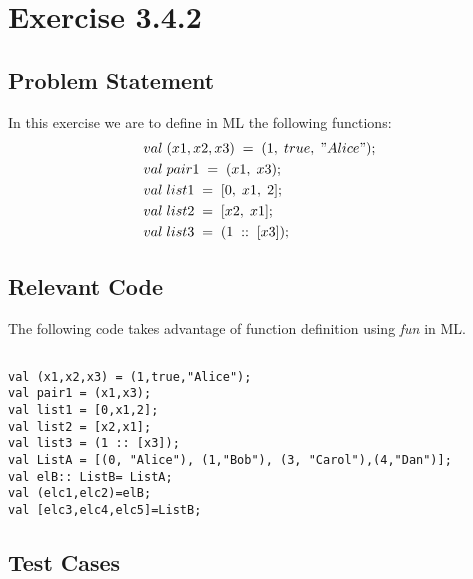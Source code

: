 \documentclass{report}
\begin{document}
\chapter{Exercise 3.4.2}
\label{cha:exercise-3.4.2}


\section{Problem Statement}
\label{sec:problem-statement-7}
In this exercise we are to define in ML the following functions:
\begin{align*}
&val\; (x1,x2,x3)\; = \;(1,\;true,\;"Alice");\\
&val\; pair1\; =\; (x1,\;x3);\\
&val\; list1\; =\; [0,\;x1,\;2];\\
&val\; list2\; =\; [x2,\;x1];\\
&val\; list3\; =\; (1\; ::\; [x3]);\\
\end{align*}


\section{Relevant Code}
\label{sec:relevant-code-3}
The following code takes advantage of function definition using
\emph{fun} in ML.

\lstset{frameround=fftt}
\begin{lstlisting}[frame=tRBL]

val (x1,x2,x3) = (1,true,"Alice");
val pair1 = (x1,x3);
val list1 = [0,x1,2];
val list2 = [x2,x1];
val list3 = (1 :: [x3]);
val ListA = [(0, "Alice"), (1,"Bob"), (3, "Carol"),(4,"Dan")];
val elB:: ListB= ListA;
val (elc1,elc2)=elB;
val [elc3,elc4,elc5]=ListB;

\end{lstlisting}
\section{Test Cases}
\label{sec:test-cases-1}
\end{document}
